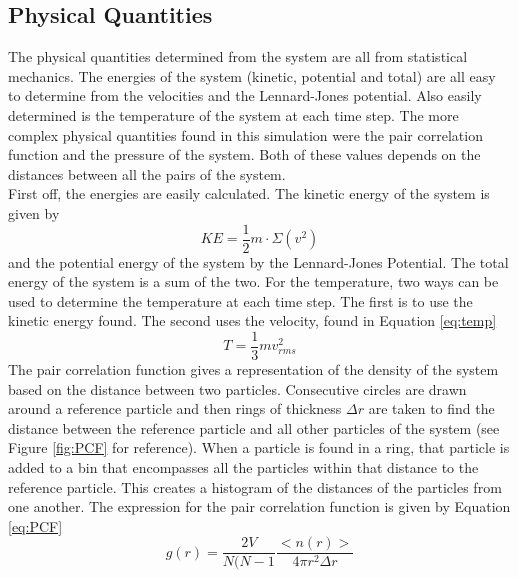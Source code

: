 \documentclass[letterpaper,12pt]{article}
\numberwithin{equation}{subsection}
\begin{document}
\subsection{Physical Quantities}
The physical quantities determined from the system are all from statistical mechanics. The energies of the system (kinetic, potential and total) are all easy to determine from the velocities and the Lennard-Jones potential. Also easily determined is the temperature of the system at each time step. The more complex physical quantities found in this simulation were the pair correlation function and the pressure of the system. Both of these values depends on the distances between all the pairs of the system. \\
\indent First off, the energies are easily calculated. The kinetic energy of the system is given by
\begin{equation}
KE = \dfrac{1}{2} m \cdot \Sigma (v^{2})
\end{equation}
and the potential energy of the system by the Lennard-Jones Potential. The total energy of the system is a sum of the two. For the temperature, two ways can be used to determine the temperature at each time step. The first is to use the kinetic energy found. The second uses the velocity, found in Equation \ref{eq:temp}
\begin{equation} \label{eq:temp}
T = \dfrac{1}{3} m v_{rms} ^{2}
\end{equation}
\indent The pair correlation function gives a representation of the density of the system based on the distance between two particles. Consecutive circles are drawn around a reference particle and then rings of thickness $\Delta r$ are taken to find the distance between the reference particle and all other particles of the system (see Figure \ref{fig:PCF} for reference). When a particle is found in a ring, that particle is added to a bin that encompasses all the particles within that distance to the reference particle. This creates a histogram of the distances of the particles from one another. The expression for the pair correlation function is given by Equation \ref{eq:PCF}
\begin{equation} \label{eq:PCF}
g(r) = \dfrac{2V}{N(N-1} \dfrac{<n(r)>}{4 \pi r^2 \Delta r}
\end{equation}
\end{document}

